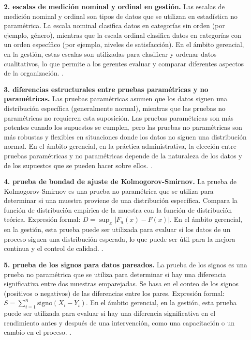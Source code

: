 {\textbf{2. escalas de medición nominal y ordinal en gestión.} Las escalas de medición nominal y ordinal son tipos de datos que se utilizan en estadística no paramétrica. La escala nominal clasifica datos en categorías sin orden (por ejemplo, género), mientras que la escala ordinal clasifica datos en categorías con un orden específico (por ejemplo, niveles de satisfacción).  En el ámbito gerencial, en la gestión, estas escalas son utilizadas para clasificar y ordenar datos cualitativos, lo que permite a los gerentes evaluar y comparar diferentes aspectos de la organización. \citep{anderson2012,lind2012,wackerly2010}.

\textbf{3. diferencias estructurales entre pruebas paramétricas y no paramétricas.} Las pruebas paramétricas asumen que los datos siguen una distribución específica (generalmente normal), mientras que las pruebas no paramétricas no requieren esta suposición. Las pruebas paramétricas son más potentes cuando los supuestos se cumplen, pero las pruebas no paramétricas son más robustas y flexibles en situaciones donde los datos no siguen una distribución normal.  En el ámbito gerencial, en la práctica administrativa, la elección entre pruebas paramétricas y no paramétricas depende de la naturaleza de los datos y de los supuestos que se pueden hacer sobre ellos. \citep{anderson2012,lind2012,wackerly2010}.

\textbf{4. prueba de bondad de ajuste de Kolmogorov-Smirnov.} La prueba de Kolmogorov-Smirnov es una prueba no paramétrica que se utiliza para determinar si una muestra proviene de una distribución específica. Compara la función de distribución empírica de la muestra con la función de distribución teórica. Expresión formal: $D = \sup_x |F_n(x) - F(x)|$. En el ámbito gerencial, en la gestión, esta prueba puede ser utilizada para evaluar si los datos de un proceso siguen una distribución esperada, lo que puede ser útil para la mejora continua y el control de calidad. \citep{anderson2012,lind2012,wackerly2010}.

\textbf{5. prueba de los signos para datos pareados.} La prueba de los signos es una prueba no paramétrica que se utiliza para determinar si hay una diferencia significativa entre dos muestras emparejadas. Se basa en el conteo de los signos (positivos o negativos) de las diferencias entre los pares. Expresión formal: $S = \sum_{i=1}^{n} \text{signo}(X_i - Y_i)$. En el ámbito gerencial, en la gestión, esta prueba puede ser utilizada para evaluar si hay una diferencia significativa en el rendimiento antes y después de una intervención, como una capacitación o un cambio en el proceso. \citep{anderson2012,lind2012,wackerly2010}.

}
